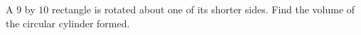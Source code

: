 A $9$ by $10$ rectangle is rotated about one of its shorter sides. Find the volume of the circular cylinder formed.
